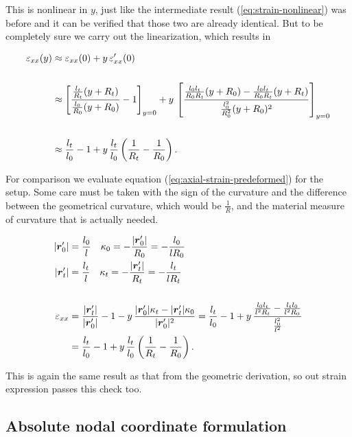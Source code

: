 This is nonlinear in $y$, just like the intermediate result (\ref{eq:strain-nonlinear}) was before and it can be verified that those two are already identical.
But to be completely sure we carry out the linearization, which results in

\begin{align}
\varepsilon_{xx}(y) &\approx \varepsilon_{xx}(0) + y\,\varepsilon_{xx}'(0) \notag \\
\notag \\
&\approx \left[\frac{\frac{l_t}{R_t}(y + R_t)}{\frac{l_0}{R_0}(y + R_0)} - 1\right]_{y=0} + y\,\left[\frac{\frac{l_0 l_t}{R_0 R_t}(y + R_0) - \frac{l_0 l_t}{R_0 R_t}(y + R_t)}{\frac{l_0^2}{R_0^2}(y + R_0)^2}\right]_{y=0} \notag \\
\notag \\
&\approx \frac{l_t}{l_0} - 1 + y\,\frac{l_t}{l_0}\left(\frac{1}{R_t} - \frac{1}{R_0}\right). \notag \\
\end{align}

For comparison we evaluate equation (\ref{eq:axial-strain-predeformed}) for the setup.
Some care must be taken with the sign of the curvature and the difference between the geometrical curvature, which would be $\frac{1}{R}$, and the material measure of curvature that is actually needed.

\begin{align}
|\boldsymbol{r}_{0}'| &= \frac{l_{0}}{l} \quad \kappa_{0} = -\frac{|\boldsymbol{r}_{0}'|}{R_{0}} = -\frac{l_{0}}{lR_{0}} \\
|\boldsymbol{r}_{t}'| &= \frac{l_{t}}{l} \quad \kappa_{t} = -\frac{|\boldsymbol{r}_{t}'|}{R_{t}} = -\frac{l_{t}}{lR_{t}} \\
\notag \\
\varepsilon_{xx} &= \frac{|\boldsymbol{r}_{t}'|}{|\boldsymbol{r}_{0}'|} - 1 - y\,\frac{|\boldsymbol{r}_{0}'|\kappa_{t} - |\boldsymbol{r}_{t}'|\kappa_{0}}{|\boldsymbol{r}_{0}'|^2} = \frac{l_{t}}{l_{0}} - 1 + y\,\frac{\frac{l_0 l_t}{l^2 R_t} - \frac{l_t l_0}{l^2 R_0}}{\frac{l_0^2}{l^2}} \notag \\
&= \frac{l_t}{l_0} - 1 + y\,\frac{l_t}{l_0}\left(\frac{1}{R_t} - \frac{1}{R_0}\right).
\end{align}

This is again the same result as that from the geometric derivation, so out strain expression passes this check too.

\newpage
\subsection{Absolute nodal coordinate formulation}

